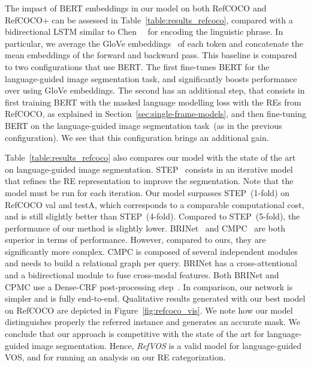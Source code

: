 \documentclass[10pt,twocolumn,letterpaper]{article}
\begin{document}
The impact of BERT embeddings in our model on both RefCOCO and RefCOCO+ can be assessed in Table~\ref{table:results_refcoco}, compared with a bidirectional LSTM similar to Chen~\etal~\cite{chen2019see} for encoding the linguistic phrase. 
In particular, we average the GloVe embeddings~\cite{pennington2014glove} of each token and concatenate the mean embeddings of the forward and backward pass.
This baseline is compared to two configurations that use BERT. The first fine-tunes BERT for the language-guided image segmentation task, and significantly boosts performance over using GloVe embeddings. The second has an additional step, that consists in first training BERT with the masked language modelling loss with the REs from RefCOCO, as explained in Section~\ref{sec:single-frame-models}, and then fine-tuning BERT on the language-guided image segmentation task~(as in the previous configuration). We see that this configuration brings an additional gain. 


Table~\ref{table:results_refcoco} also compares our model with the state of the art on language-guided image segmentation.
STEP~\cite{chen2019see} consists in an iterative model that refines the RE representation to improve the segmentation. Note that the model must be run for each iteration. Our model surpasses STEP~(1-fold) on RefCOCO val and testA, which corresponds to a comparable computational cost, and is still slightly better than STEP~(4-fold). Compared to STEP~(5-fold), the performance of our method is slightly lower. BRINet~\cite{hu2020bi} and CMPC~\cite{huang2020referring} are both superior in terms of performance. However, compared to ours, they are significantly more complex. CMPC is composed of several independent modules and needs to build a relational graph per query. BRINet has a cross-attentional and a bidirectional module to fuse cross-modal features. Both BRINet and CPMC use a Dense-CRF post-processing step~\cite{krahenbuhl2011efficient}. In comparison, our network is simpler and is fully end-to-end. Qualitative results generated with our best model on RefCOCO are depicted in Figure~\ref{fig:refcoco_vis}. We note how our model distinguishes properly the referred instance and generates an accurate mask. We conclude that our approach is competitive with the state of the art for language-guided image segmentation. Hence, \textit{RefVOS} is a valid model for language-guided VOS, and for running an analysis on our RE categorization.
\end{document}
